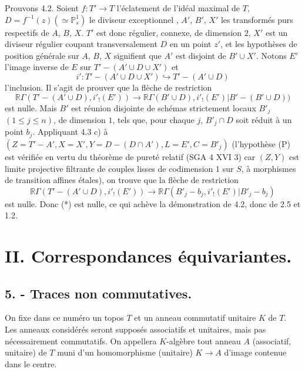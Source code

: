 \documentclass[11pt]{article}
\newcommand{\R}{\mathbb{R}}\newcommand{\RHomCore}{\mathbb{R}\mathrm{Hom}}
\providecommand{\R}{\mathrm R}
\begin{document}
Prouvons 4.2. Soient $f:T'\to T$ l'éclatement de l'idéal
maximal de $T$, $D=f^{-1}(z)(\simeq\mathbb P^1_s)$ le diviseur exceptionnel%
, $A'$, $B'$, $X'$ les transformés purs respectifs de $A$, $B$, $X$. $T'$ est donc régulier, connexe, de dimension $2$, $X'$ est un diviseur régulier coupant transversalement $D$ en un point $z'$, et les hypothèses de position générale sur $A$, $B$, $X$ signifient que $A'$ est disjoint de 
$B'\cup X'$. Notons $E'$ l'image inverse de $E$ sur $T'-(A'\cup D\cup X')$ et
\[
i':T'-(A'\cup D\cup X')\hookrightarrow T'-(A'\cup D)
\]
l'inclusion. Il s'agit de prouver que la flèche de restriction
\begin{equation}
\R\Gamma(T'-(A'\cup D),i'_!(E'))
\longrightarrow
\R\Gamma(B'\cup D),i'_!(E')|B'-(B'\cup D))
\tag{*}
\end{equation}
est nulle. Mais $B'$ est réunion disjointe de schémas strictement locaux $B'_j$ $(1\le j\le n)$, de dimension $1$, tels que, pour chaque $j$, $B'_j\cap D$ soit réduit à un point $b_j$. Appliquant 4.3 c) à $(Z=T'-A', X=X', Y=D-(D\cap A'), L=E', C=B'_j)$ (l'hypothèse (P) est vérifiée en vertu du théorème de pureté relatif (SGA 4 XVI 3) car $(Z,Y)$ est limite projective filtrante de couples lisses de codimension $1$ sur $S$, à morphismes de transition affines étales), on trouve que la flèche de restriction
\[
\R\Gamma(T'-(A'\cup D),i'_!(E'))
\longrightarrow
\R\Gamma(B'_j-b_j,i'_!(E')|B'_j-b_j)
\]
est nulle. Donc (*) est nulle, ce qui achève la démonstration de 4.2, donc de 2.5 et 1.2.

\section*{II. Correspondances équivariantes.}

\subsection*{5. - Traces non commutatives.}

On fixe dans ce numéro un topos $T$ et un anneau commutatif unitaire $K$ de $T$. Les anneaux considérés seront supposés associatifs et unitaires, mais pas nécessairement commutatifs. On appellera $K$-algèbre tout anneau $A$ (associatif, unitaire) de $T$ muni d'un homomorphisme (unitaire) $K\to A$ d'image contenue dans le centre.
\end{document}

